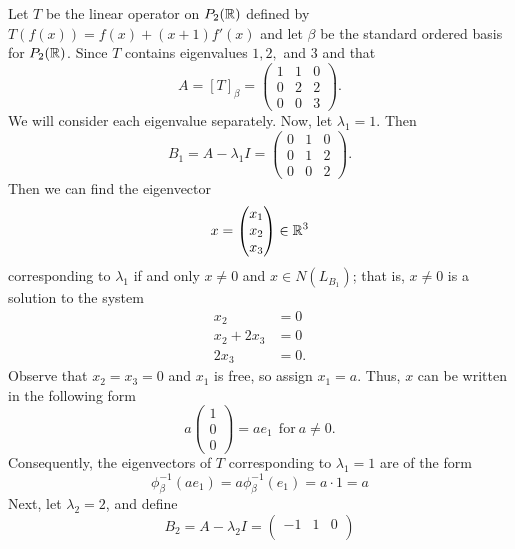 \begin{eg}
    Let \( T  \) be the linear operator on \( {P}_{2}(\mathbb{R}) \) defined by \( T(f(x)) = f(x) + (x+1) f'(x) \) and let \( \beta  \) be the standard ordered basis for \( {P}_{2}(\mathbb{R}) \). Since \( T  \) contains eigenvalues \( 1,2,  \) and \( 3  \) and that
    \[  A = [T]_{\beta} = \begin{pmatrix} 
        1 & 1 & 0 \\
        0 & 2 & 2 \\
        0 & 0 & 3 
              \end{pmatrix}. \]
        We will consider each eigenvalue separately. Now, let \( {\lambda}_{1} = 1  \). Then 
        \[  {B}_{1} = A - {\lambda}_{1} I = \begin{pmatrix} 
            0 & 1 & 0 \\
            0 & 1 & 2 \\
            0 & 0 & 2 
                  \end{pmatrix}. \]
Then we can find the eigenvector
\[  x = \begin{pmatrix} 
           {x}_{1} \\
           {x}_{2} \\
           {x}_{3}
          \end{pmatrix} \in \mathbb{R}^{3} \] 
 corresponding to \( {\lambda}_{1} \) if and only \( x \neq  0  \) and \( x \in N({L}_{{B}_{1}}) \); that is, \( x \neq 0   \) is a solution to the system  
 \begin{align*}
     {x}_{2} &= 0   \\
     {x}_{2} + {2x}_{3} &= 0 \\
     {2x}_{3} &= 0.
 \end{align*}
 Observe that \( {x}_{2} =    {x}_{3} = 0  \) and \( {x}_{1}  \) is free, so assign \( {x}_{1} = a  \). Thus, \( x  \) can be written in the following form
 \[  a \begin{pmatrix} 
            1 \\
            0 \\
            0 
        \end{pmatrix} = a {e}_{1} \ \ \text{for} \ a \neq 0. \]
    Consequently, the eigenvectors of \( T  \) corresponding to \( {\lambda}_{1} = 1  \) are of the form
    \[  {\phi}_{\beta}^{-1} (a {e}_{1}) = a {\phi}_{\beta}^{-1} ({e}_{1}) = a \cdot 1 = a  \]
    Next, let \( {\lambda}_{2} = 2  \), and define 
    \[  {B}_{2} = A - {\lambda}_{2} I = \begin{pmatrix} 
        -1 & 1 & 0 \\

\end{pmatrix}\]
\end{eg}
